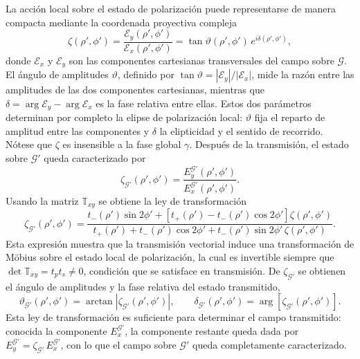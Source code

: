 La acción local sobre el estado de polarización puede representarse de manera
compacta mediante la coordenada proyectiva compleja \cite{azzam1977}
\begin{equation}
\zeta(\rho',\phi')
=
\frac{\mathscr E_y(\rho',\phi')}{\mathscr E_x(\rho',\phi')}
=
\tan \vartheta(\rho',\phi')\, e^{i\delta(\rho',\phi')},
\label{eq:zeta_def}
\end{equation}
donde $\mathscr E_x$ y $\mathscr E_y$ son las componentes cartesianas
transversales del campo sobre $\mathscr{G}$. El ángulo de amplitudes
$\vartheta$, definido por $\tan\vartheta=|\mathscr E_y|/|\mathscr E_x|$, mide
la razón entre las amplitudes de las dos componentes cartesianas, mientras que
$\delta=\arg\mathscr E_y-\arg\mathscr E_x$ es la fase relativa entre ellas.
Estos dos parámetros determinan por completo la elipse de polarización local:
$\vartheta$ fija el reparto de amplitud entre las componentes y $\delta$ la
elipticidad y el sentido de recorrido. Nótese que $\zeta$ es insensible
a la fase global $\gamma$. Después de la transmisión, el estado sobre
$\mathscr{G}'$ queda caracterizado por
\begin{equation}
\zeta_{\mathscr{G}'}(\rho',\phi')
=
\frac{E_y^{\mathscr{G}'}(\rho',\phi')}{E_x^{\mathscr{G}'}(\rho',\phi')}.
\label{eq:zeta_Gp_def}
\end{equation}
Usando la matriz $\mathbb{T}_{xy}$ se obtiene la ley de transformación
\begin{equation}
\boxed{
\zeta_{\mathscr{G}'}(\rho',\phi')
=
\frac{
t_-(\rho')\sin 2\phi'
+
\left[t_+(\rho') - t_-(\rho')\cos 2\phi'\right]\zeta(\rho',\phi')
}{
t_+(\rho') + t_-(\rho')\cos 2\phi'
+
t_-(\rho')\sin 2\phi'\,\zeta(\rho',\phi')
}.
}
\label{eq:mobius_transformation}
\end{equation}
Esta expresión muestra que la transmisión vectorial induce una transformación
de Möbius sobre el estado local de polarización, la cual es invertible siempre
que $\det \mathbb{T}_{xy}=t_p t_s \neq 0$, condición que se satisface en
transmisión. De $\zeta_{\mathscr{G}'}$ se obtienen el ángulo de amplitudes y
la fase relativa del estado transmitido,
\begin{equation}
\vartheta_{\mathscr{G}'}(\rho',\phi')
=
\arctan \left|\zeta_{\mathscr{G}'}(\rho',\phi')\right|,
\qquad
\delta_{\mathscr{G}'}(\rho',\phi')
=
\arg \left[\zeta_{\mathscr{G}'}(\rho',\phi')\right].
\label{eq:jones_params_transmitted}
\end{equation}
Esta ley de transformación es suficiente para determinar el campo transmitido:
conocida la componente $E_x^{\mathscr{G}'}$, la componente restante queda dada
por $E_y^{\mathscr{G}'}=\zeta_{\mathscr{G}'}\,E_x^{\mathscr{G}'}$, con lo que
el campo sobre $\mathscr{G}'$ queda completamente caracterizado.

